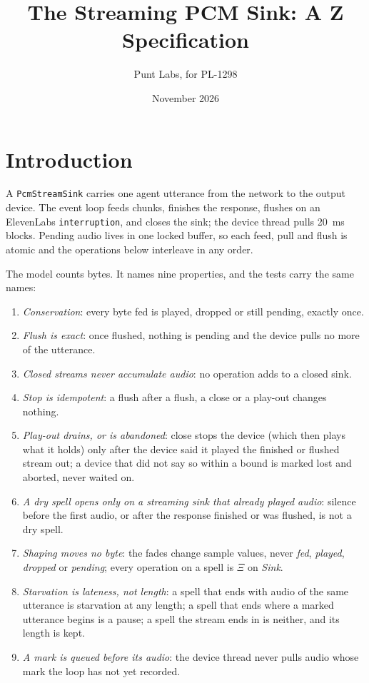 \documentclass[a4paper,10pt,fleqn]{article}
\begin{document}
\title{The Streaming PCM Sink: A Z Specification}
\author{Punt Labs, for PL-1298}
\date{November 2026}
\maketitle

\section{Introduction}

A \texttt{PcmStreamSink} carries one agent utterance from the network to the
output device. The event loop feeds chunks, finishes the response, flushes on
an ElevenLabs \texttt{interruption}, and closes the sink; the device thread
pulls 20~ms blocks. Pending audio lives in one locked buffer, so each feed,
pull and flush is atomic and the operations below interleave in any order.

The model counts bytes. It names nine properties, and the tests carry the
same names:

\begin{enumerate}
  \item[P1] \emph{Conservation}: every byte fed is played, dropped or still
    pending, exactly once.
  \item[P2] \emph{Flush is exact}: once flushed, nothing is pending and the
    device pulls no more of the utterance.
  \item[P3] \emph{Closed streams never accumulate audio}: no operation adds to
    a closed sink.
  \item[P4] \emph{Stop is idempotent}: a flush after a flush, a close or a
    play-out changes nothing.
  \item[P5] \emph{Play-out drains, or is abandoned}: close stops the device
    (which then plays what it holds) only after the device said it played the
    finished or flushed stream out; a device that did not say so within a
    bound is marked lost and aborted, never waited on.
  \item[P6] \emph{A dry spell opens only on a streaming sink that already
    played audio}: silence before the first audio, or after the response
    finished or was flushed, is not a dry spell.
  \item[P7] \emph{Shaping moves no byte}: the fades change sample values,
    never \emph{fed}, \emph{played}, \emph{dropped} or \emph{pending}; every
    operation on a spell is $\Xi$ on \emph{Sink}.
  \item[P8] \emph{Starvation is lateness, not length}: a spell that ends
    with audio of the same utterance is starvation at any length; a spell that
    ends where a marked utterance begins is a pause; a spell the stream ends in
    is neither, and its length is kept.
  \item[P9] \emph{A mark is queued before its audio}: the device thread never
    pulls audio whose mark the loop has not yet recorded.
\end{enumerate}
\end{document}

